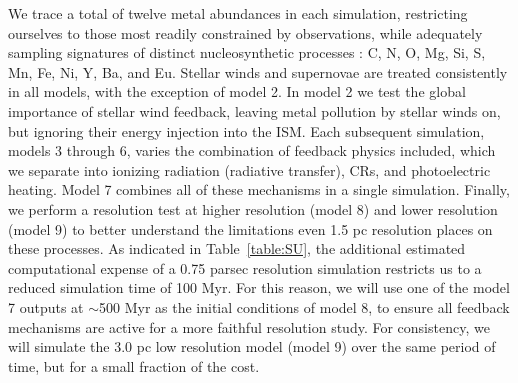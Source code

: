 \documentclass[11pt]{article}
\begin{document}
We trace a total of twelve metal abundances in each simulation, restricting ourselves to those most readily constrained by observations, while adequately sampling signatures of distinct nucleosynthetic processes \citep[see][and references therein]{Tolstoy2009}: C, N, O, Mg, Si, S, Mn, Fe, Ni, Y, Ba, and Eu. Stellar winds and supernovae are treated consistently in all models, with the exception of model 2. In model 2 we test the global importance of stellar wind feedback, leaving metal pollution by stellar winds on, but ignoring their energy injection into the ISM. Each subsequent simulation, models 3 through 6, varies the combination of feedback physics included, which we separate into ionizing radiation (radiative transfer), CRs, and photoelectric heating. Model 7 combines all of these mechanisms in a single simulation. Finally, we perform a resolution test at higher resolution (model 8) and lower resolution (model 9) to better understand the limitations even 1.5 pc resolution places on these processes. As indicated in Table~\ref{table:SU}, the additional estimated computational expense of a 0.75 parsec resolution simulation restricts us to a reduced simulation time of 100 Myr. For this reason, we will use one of the model 7 outputs at $\sim$500 Myr as the initial conditions of model 8, to ensure all feedback mechanisms are active for a more faithful resolution study. For consistency, we will simulate the 3.0 pc low resolution model (model 9) over the same period of time, but for a small fraction of the cost.
\end{document}
